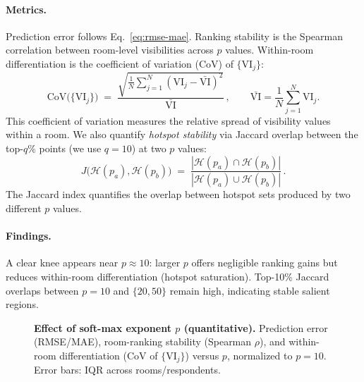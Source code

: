 \documentclass[final,3p,times,review]{elsarticle}
\begin{document}
\paragraph{Metrics.}
Prediction error follows Eq.~\eqref{eq:rmse-mae}. Ranking stability is the Spearman correlation between room-level visibilities across $p$ values. Within-room differentiation is the coefficient of variation (CoV) of $\{\mathrm{VI}_j\}$:
\begin{equation}
\mathrm{CoV}\big(\{\mathrm{VI}_j\}\big) \;=\; \frac{\sqrt{\frac{1}{N}\sum_{j=1}^N(\mathrm{VI}_j-\bar{\mathrm{VI}})^2}}{\bar{\mathrm{VI}}}
\,, \qquad
\bar{\mathrm{VI}}=\frac{1}{N}\sum_{j=1}^N \mathrm{VI}_j.
\label{eq:cov-vi}
\end{equation}
This coefficient of variation measures the relative spread of visibility values within a room.
We also quantify \emph{hotspot stability} via Jaccard overlap between the top-$q$\% points (we use $q{=}10$) at two $p$ values:
\begin{equation}
J\!\big(\mathcal{H}(p_a),\mathcal{H}(p_b)\big) \;=\; 
\frac{ \left| \mathcal{H}(p_a)\cap \mathcal{H}(p_b) \right| }
     { \left| \mathcal{H}(p_a)\cup \mathcal{H}(p_b) \right| } \,.
\label{eq:jaccard}
\end{equation}
The Jaccard index quantifies the overlap between hotspot sets produced by two different $p$ values.

\paragraph{Findings.}
A clear knee appears near $p{\approx}10$: larger $p$ offers negligible ranking gains but reduces within-room differentiation (hotspot saturation). Top-10\% Jaccard overlaps between $p{=}10$ and $\{20,50\}$ remain high, indicating stable salient regions.

\begin{figure}[t]
  \centering
  \caption{\textbf{Effect of soft-max exponent $p$ (quantitative).} Prediction error (RMSE/MAE), room-ranking stability (Spearman $\rho$), and within-room differentiation (CoV of $\{\mathrm{VI}_j\}$) versus $p$, normalized to $p{=}10$. Error bars: IQR across rooms/respondents.}
  \label{fig:sens-metrics-p}
\end{figure}
\end{document}
